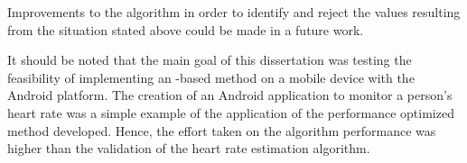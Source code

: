 Improvements to the algorithm in order to identify and reject the values
resulting from the situation stated above could be made in a future work.

It should be noted that the main goal of this dissertation was testing the
feasibility of implementing an \evm{}-based method on a mobile device with
the Android platform. The creation of an Android application to monitor
a person's heart rate was a simple example of the application of the
performance optimized \evm{} method developed.
Hence, the effort taken on the algorithm performance was higher than
the validation of the heart rate estimation algorithm.



